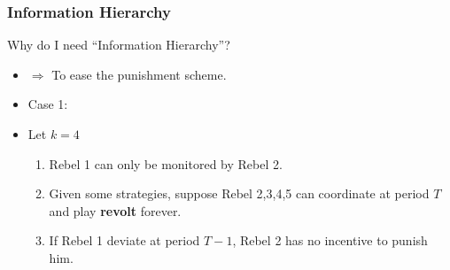 \documentclass[10pt]{beamer}
\begin{document}
\begin{frame}
   \frametitle{Information Hierarchy}


Why do I need ``Information Hierarchy''?
\begin{itemize}
\item $\Rightarrow$ To ease the punishment scheme.
\item Case 1: \item Let $k=4$
\begin{center}
\end{center}

\begin{enumerate}
\item Rebel 1 can only be monitored by Rebel 2.
\item Given some strategies, suppose Rebel 2,3,4,5 can coordinate at period $T$ and play \textbf{revolt} forever.
\item If Rebel 1 deviate at period $T-1$, Rebel 2 has no incentive to punish him.
\end{enumerate}

\end{itemize}



\end{frame}
\end{document}
